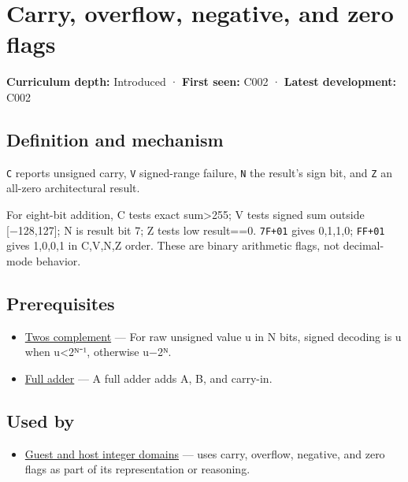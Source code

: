 \hypertarget{appendix-8d687c9c08ab}{}
\section{Carry, overflow, negative, and zero flags}\label{appendix-8d687c9c08ab-carry-overflow-negative-and-zero-flags}

\textbf{Curriculum depth:} Introduced · \textbf{First seen:} C002 · \textbf{Latest development:} C002

\subsection{Definition and mechanism}\label{appendix-8d687c9c08ab-definition-and-mechanism}

\texttt{C} reports unsigned carry, \texttt{V} signed-range failure, \texttt{N} the result's sign bit, and \texttt{Z} an all-zero architectural result.

For eight-bit addition, C tests exact sum\textgreater255; V tests signed sum outside {[}−128,127{]}; N is result bit 7; Z tests low result==0. \texttt{7F+01} gives 0,1,1,0; \texttt{FF+01} gives 1,0,0,1 in C,V,N,Z order. These are binary arithmetic flags, not decimal-mode behavior.

\subsection{Prerequisites}\label{appendix-8d687c9c08ab-prerequisites}

\begin{itemize}
\tightlist
\item
  \hyperref[appendix-4fbc03d20829]{Two\textquotesingle s complement} --- For raw unsigned value u in N bits, signed decoding is u when u\textless2ᴺ⁻¹, otherwise u−2ᴺ.
\item
  \hyperref[appendix-d1a5b1e520c2]{Full adder} --- A full adder adds A, B, and carry-in.
\end{itemize}

\subsection{Used by}\label{appendix-8d687c9c08ab-used-by}

\begin{itemize}
\tightlist
\item
  \hyperref[appendix-33e7a011b684]{Guest and host integer domains} --- uses carry, overflow, negative, and zero flags as part of its representation or reasoning.
\end{itemize}

